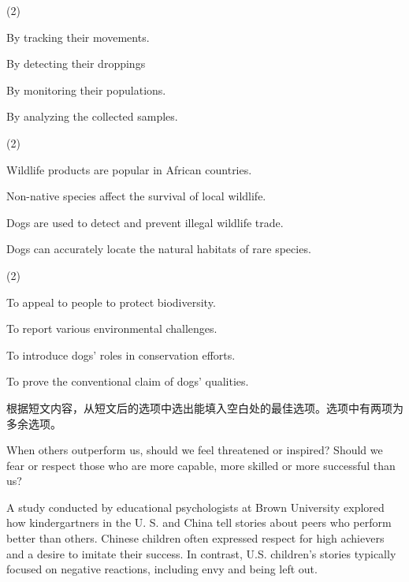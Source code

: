 \documentclass{英语试卷}
\begin{document}
\begin{choices}(2)
  \item By tracking their movements.
  \item By detecting their droppings
  \item By monitoring their populations.
  \item By analyzing the collected samples.
\end{choices}
\begin{choices}(2)
  \item Wildlife products are popular in African countries.
  \item Non-native species affect the survival of local wildlife.
  \item Dogs are used to detect and prevent illegal wildlife trade.
  \item Dogs can accurately locate the natural habitats of rare species.
\end{choices}
\begin{choices}(2)
  \item To appeal to people to protect biodiversity.
  \item To report various environmental challenges.
  \item To introduce dogs' roles in conservation efforts.
  \item To prove the conventional claim of dogs' qualities.
\end{choices}
\par 根据短文内容，从短文后的选项中选出能填入空白处的最佳选项。选项中有两项为多余选项。\par
\par When others outperform us, should we feel threatened or inspired? Should we fear or respect those who are more capable, more skilled or more successful than us? \par
\par A study conducted by educational psychologists at Brown University explored how kindergartners in the U. S. and China tell stories about peers who perform better than others.  Chinese children often expressed respect for high achievers and a desire to imitate their success. In contrast, U.S. children's stories typically focused on negative reactions, including envy and being left out.\par
\end{document}
